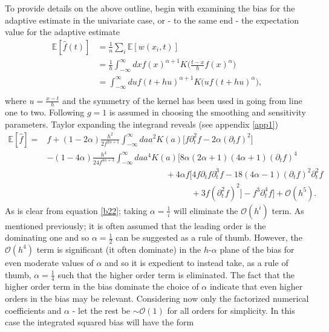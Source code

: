\noindent To provide details on the above outline, begin with examining the bias for the adaptive estimate in the univariate case, or - to the same end - the expectation value for the adaptive estimate
\begin{equation}
	\begin{split}
		\mathbb{E}[\hat{f}(t)]&=\frac{1}{n}\sum_i\mathbb{E}[w(x_i,t)]\\
		&=\frac{1}{h}\int_{-\infty}^{\infty} dx f(x)^{\alpha+1} K\bigg(\frac{t-x}{h}f(x)^\alpha\bigg)\\
		&=\int_{-\infty}^{\infty} du f(t+hu)^{\alpha+1} K\big(uf(t+hu)^\alpha\big),\\
	\end{split}
	\label{b1}
\end{equation}
where $u=\frac{x-t}{h}$ and the symmetry of the kernel has been used in going from line one to two. Following \citep{silverman} $g=1$ is assumed in choosing the smoothing and sensitivity parameters. Taylor expanding the integrand reveals (see appendix \ref{app1})
\begin{equation}
	\begin{split}
		\mathbb{E}[\hat{f}]=&f+(1-2\alpha)\frac{h^2}{2f^{2\alpha+1}}\int_{-\infty}^{\infty} da a^2K(a)\big[f\partial_t^2f-2\alpha(\partial_tf)^2\big]\\
		&-(1-4\alpha)\frac{h^4}{24f^{4\alpha +3}}\int_{-\infty}^{\infty} da a^4 K(a)\big[8\alpha(2\alpha+1)(4\alpha+1)(\partial_tf)^4\\
		&\qquad\qquad\qquad\qquad\qquad\qquad\qquad+4\alpha f[4f\partial_tf \partial_t^3f-18(4\alpha-1)(\partial_tf)^2\partial_t^2f\\
		&\qquad\qquad\qquad\qquad\qquad\qquad\qquad\qquad\quad+3f(\partial_t^2f)^2]-f^3\partial_t^4f
		\big]+\mathcal{O}(h^5).
	\end{split}
	\label{b22}
\end{equation}
As is clear from equation \eqref{b22}; taking $\alpha=\frac{1}{i}$ will eliminate the $\mathcal{O}(h^i)$ term. As mentioned previously; it is often assumed that the leading order is the dominating one and so $\alpha=\frac{1}{2}$ can be suggested as a rule of thumb\citep{silverman}. However, the $\mathcal{O}(h^4)$ term is significant (it often dominate) in the $h$-$\alpha$ plane of the bias for even moderate values of $\alpha$ and so it is expedient to instead take, as a rule of thumb, $\alpha=\frac{1}{4}$ such that the higher order term is eliminated. The fact that the higher order term in the bias dominate the choice of $\alpha$ indicate that even higher orders in the bias may be relevant. Considering now only the factorized numerical coefficients and $\alpha$ - let the rest be $\sim\mathcal{O}(1)$ for all orders for simplicity. In this case the integrated squared bias will have the form
